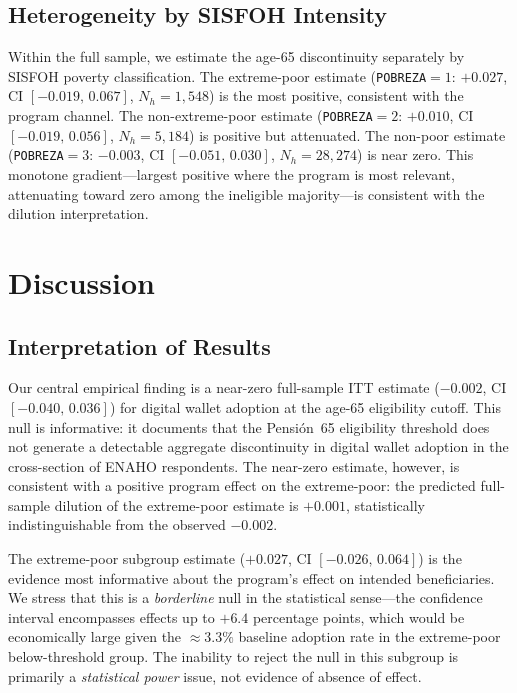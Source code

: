 \documentclass[12pt]{article}
\begin{document}
\subsection{Heterogeneity by SISFOH Intensity}

Within the full sample, we estimate the age-65 discontinuity separately
by SISFOH poverty classification. The extreme-poor estimate
(\texttt{POBREZA}$=1$: $+0.027$, CI $[-0.019,\,0.067]$, $N_h=1{,}548$)
is the most positive, consistent with the program channel. The
non-extreme-poor estimate (\texttt{POBREZA}$=2$: $+0.010$,
CI $[-0.019,\,0.056]$, $N_h=5{,}184$) is positive but attenuated.
The non-poor estimate (\texttt{POBREZA}$=3$: $-0.003$,
CI $[-0.051,\,0.030]$, $N_h=28{,}274$) is near zero. This monotone
gradient---largest positive where the program is most relevant,
attenuating toward zero among the ineligible majority---is consistent
with the dilution interpretation.


\section{Discussion}
\label{sec:discussion}

\subsection{Interpretation of Results}

Our central empirical finding is a near-zero full-sample ITT estimate
($-0.002$, CI $[-0.040,\,0.036]$) for digital wallet adoption at the
age-65 eligibility cutoff. This null is informative: it documents that
the Pensi\'on~65 eligibility threshold does not generate a detectable
aggregate discontinuity in digital wallet adoption in the cross-section of
ENAHO respondents. The near-zero estimate, however, is consistent with a
positive program effect on the extreme-poor: the predicted full-sample
dilution of the extreme-poor estimate is $+0.001$, statistically
indistinguishable from the observed $-0.002$.

The extreme-poor subgroup estimate ($+0.027$, CI $[-0.026,\,0.064]$) is
the evidence most informative about the program's effect on intended
beneficiaries. We stress that this is a \emph{borderline} null in the
statistical sense---the confidence interval encompasses effects up to
$+6.4$ percentage points, which would be economically large given the
$\approx 3.3\%$ baseline adoption rate in the extreme-poor below-threshold
group. The inability to reject the null in this subgroup is primarily a
\emph{statistical power} issue, not evidence of absence of effect.
\end{document}
